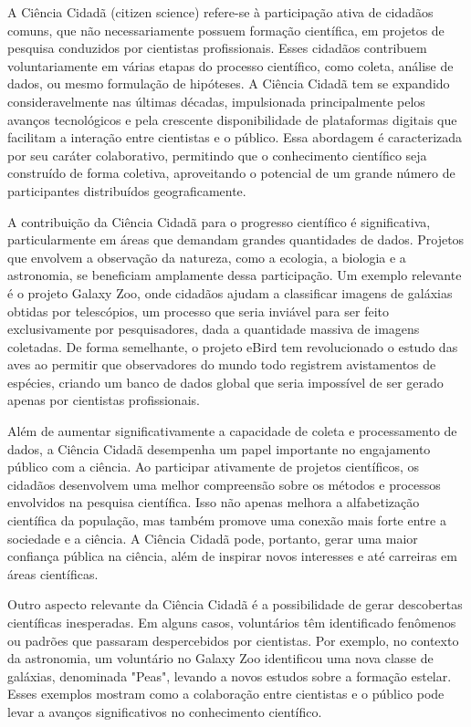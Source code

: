 A Ciência Cidadã (citizen science) refere-se à participação ativa de cidadãos comuns, que não necessariamente possuem formação científica, em projetos de pesquisa conduzidos por cientistas profissionais. Esses cidadãos contribuem voluntariamente em várias etapas do processo científico, como coleta, análise de dados, ou mesmo formulação de hipóteses. A Ciência Cidadã tem se expandido consideravelmente nas últimas décadas, impulsionada principalmente pelos avanços tecnológicos e pela crescente disponibilidade de plataformas digitais que facilitam a interação entre cientistas e o público. Essa abordagem é caracterizada por seu caráter colaborativo, permitindo que o conhecimento científico seja construído de forma coletiva, aproveitando o potencial de um grande número de participantes distribuídos geograficamente.

A contribuição da Ciência Cidadã para o progresso científico é significativa, particularmente em áreas que demandam grandes quantidades de dados. Projetos que envolvem a observação da natureza, como a ecologia, a biologia e a astronomia, se beneficiam amplamente dessa participação. Um exemplo relevante é o projeto Galaxy Zoo, onde cidadãos ajudam a classificar imagens de galáxias obtidas por telescópios, um processo que seria inviável para ser feito exclusivamente por pesquisadores, dada a quantidade massiva de imagens coletadas. De forma semelhante, o projeto eBird tem revolucionado o estudo das aves ao permitir que observadores do mundo todo registrem avistamentos de espécies, criando um banco de dados global que seria impossível de ser gerado apenas por cientistas profissionais.

Além de aumentar significativamente a capacidade de coleta e processamento de dados, a Ciência Cidadã desempenha um papel importante no engajamento público com a ciência. Ao participar ativamente de projetos científicos, os cidadãos desenvolvem uma melhor compreensão sobre os métodos e processos envolvidos na pesquisa científica. Isso não apenas melhora a alfabetização científica da população, mas também promove uma conexão mais forte entre a sociedade e a ciência. A Ciência Cidadã pode, portanto, gerar uma maior confiança pública na ciência, além de inspirar novos interesses e até carreiras em áreas científicas.

Outro aspecto relevante da Ciência Cidadã é a possibilidade de gerar descobertas científicas inesperadas. Em alguns casos, voluntários têm identificado fenômenos ou padrões que passaram despercebidos por cientistas. Por exemplo, no contexto da astronomia, um voluntário no Galaxy Zoo identificou uma nova classe de galáxias, denominada "Peas", levando a novos estudos sobre a formação estelar. Esses exemplos mostram como a colaboração entre cientistas e o público pode levar a avanços significativos no conhecimento científico.

